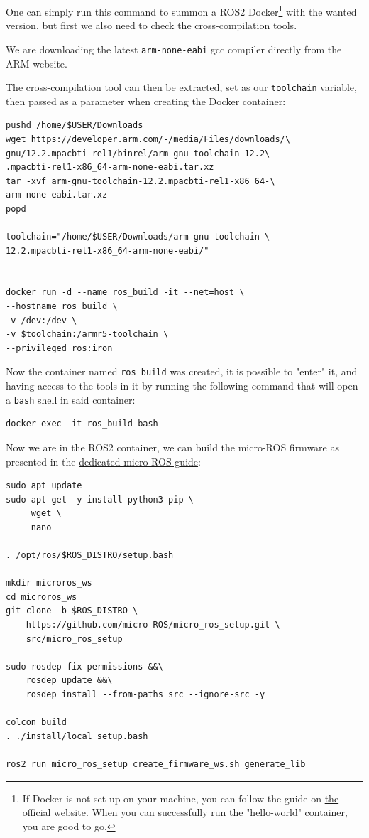 \documentclass[10pt]{article}
\begin{document}
One can simply run this command to summon a ROS2 Docker\footnote{If Docker is not set up on your machine, you can follow the guide on \href{https://docs.docker.com/engine/install/ubuntu/}{the official website}.
When you can successfully run the "hello-world" container, you are good to go.} with the wanted version,
but first we also need to check the cross-compilation tools.

We are downloading the latest \texttt{arm-none-eabi} gcc compiler directly from the ARM website.

The cross-compilation tool can then be extracted, set as our \texttt{toolchain} variable,
then passed as a parameter when creating the Docker container:
\begin{verbatim}
pushd /home/$USER/Downloads
wget https://developer.arm.com/-/media/Files/downloads/\
gnu/12.2.mpacbti-rel1/binrel/arm-gnu-toolchain-12.2\
.mpacbti-rel1-x86_64-arm-none-eabi.tar.xz
tar -xvf arm-gnu-toolchain-12.2.mpacbti-rel1-x86_64-\
arm-none-eabi.tar.xz
popd

toolchain="/home/$USER/Downloads/arm-gnu-toolchain-\
12.2.mpacbti-rel1-x86_64-arm-none-eabi/"


docker run -d --name ros_build -it --net=host \
--hostname ros_build \
-v /dev:/dev \
-v $toolchain:/armr5-toolchain \
--privileged ros:iron
\end{verbatim}

Now the container named \texttt{ros\_build} was created, it is possible to "enter" it, and having access
to the tools in it by running the following command that will open a \texttt{bash} shell in said container:
\begin{verbatim}
docker exec -it ros_build bash
\end{verbatim}

Now we are in the ROS2 container, we can build the micro-ROS firmware as presented
in the \href{https://micro.ros.org/docs/tutorials/advanced/create\\\_custom\\\_static\\\_library}{dedicated micro-ROS guide}:
\begin{verbatim}
sudo apt update 
sudo apt-get -y install python3-pip \
     wget \
     nano

. /opt/ros/$ROS_DISTRO/setup.bash

mkdir microros_ws
cd microros_ws
git clone -b $ROS_DISTRO \
    https://github.com/micro-ROS/micro_ros_setup.git \
    src/micro_ros_setup

sudo rosdep fix-permissions &&\
    rosdep update &&\
    rosdep install --from-paths src --ignore-src -y

colcon build
. ./install/local_setup.bash

ros2 run micro_ros_setup create_firmware_ws.sh generate_lib
\end{verbatim}
\end{document}
